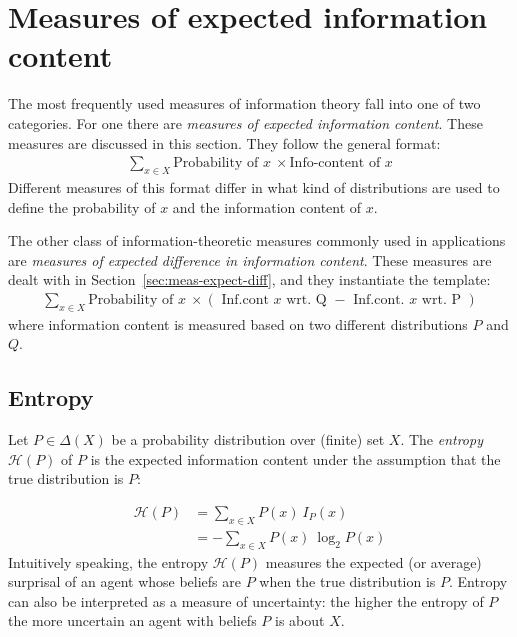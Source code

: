 \documentclass[nobib,nofonts]{tufte-handout}
\begin{document}
\section{Measures of expected information content}

The most frequently used measures of information theory fall into one of two categories.
For one there are \emph{measures of expected information content}.
These measures are discussed in this section.
They follow the general format:
\begin{align*}
  \sum_{x \in X} \text{Probability of } x \ \times \text{Info-content of } x
\end{align*}
Different measures of this format differ in what kind of distributions are used to define the probability of $x$ and the information content of $x$.

The other class of information-theoretic measures commonly used in applications are \emph{measures of expected difference in information content}.
These measures are dealt with in Section~\ref{sec:meas-expect-diff}, and they instantiate the template:
\begin{align*}
  \sum_{x \in X} \text{Probability of } x \ \times (\text{ Inf.cont } x \text{ wrt. Q } - \text{ Inf.cont. } x \text{ wrt. P })
\end{align*}
where information content is measured based on two different distributions $P$ and $Q$.

\subsection{Entropy}

Let $P\in \Delta(X)$ be a probability distribution over (finite) set $X$.
The \emph{entropy} $\mathcal{H}(P)$ of $P$ is the expected information content under the assumption that the true distribution is $P$:

\begin{align*}
  \mathcal{H}(P) & = \sum_{x \in X} P(x) \ I_{P}(x) \\
                 & = - \sum_{x \in X} P(x) \ \log_{2} P(x)
\end{align*}
Intuitively speaking, the entropy $\mathcal{H}(P)$ measures the expected (or average) surprisal of an agent whose beliefs are $P$ when the true distribution is $P$.
Entropy can also be interpreted as a measure of uncertainty: the higher the entropy of $P$ the more uncertain an agent with beliefs $P$ is about $X$.
\end{document}
